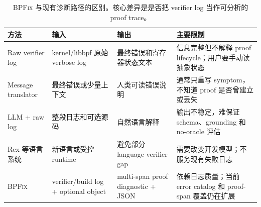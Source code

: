 \documentclass[letterpaper,twocolumn,10pt]{article}
\newcommand{\sys}{\textsc{BPFix}\xspace}
\begin{document}
\begin{table}[t]
\centering
\small
\caption{\sys 与现有诊断路径的区别。核心差异是是否把 verifier log 当作可分析的 proof trace。}
\label{tab:positioning}
\begin{tabularx}{\textwidth}{@{}l X X X@{}}
\toprule
方法 & 输入 & 输出 & 主要限制 \\
\midrule
Raw verifier log & kernel/libbpf 原始 verbose log & 最终错误和寄存器状态文本 & 信息完整但不解释 proof lifecycle；用户要手动读抽象状态 \\
Message translator & 最终错误或少量上下文 & 人类可读错误说明 & 通常只重写 symptom，不知道 proof 是否曾建立或丢失 \\
LLM + raw log & 整段日志和可选源码 & 自然语言解释 & 输出不稳定，难保证 schema、grounding 和 no-oracle 评估 \\
Rex 等语言系统 & 新语言或受控 runtime & 避免部分 language-verifier gap & 需要改变开发模型；不服务现有失败日志 \\
\sys & verifier/build log + optional object & multi-span proof diagnostic + JSON & 依赖日志质量；当前 error catalog 和 proof-span 覆盖仍在扩展 \\
\bottomrule
\end{tabularx}
\end{table}
\end{document}
